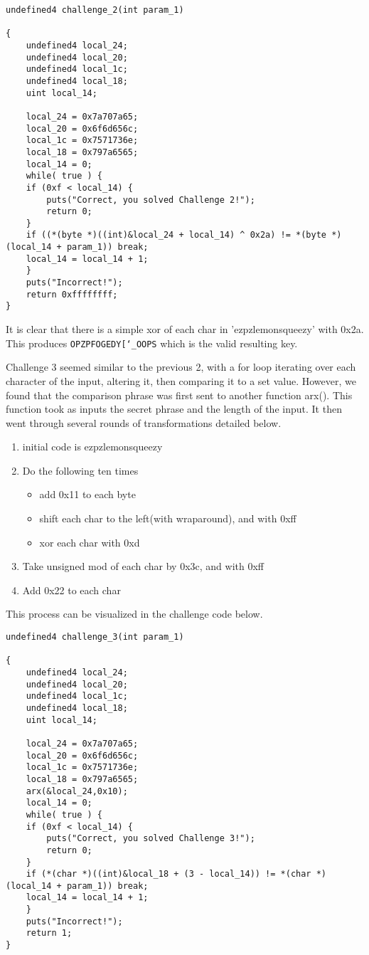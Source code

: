 \begin{lstlisting}
undefined4 challenge_2(int param_1)

{
	undefined4 local_24;
	undefined4 local_20;
	undefined4 local_1c;
	undefined4 local_18;
	uint local_14;
	
	local_24 = 0x7a707a65;
	local_20 = 0x6f6d656c;
	local_1c = 0x7571736e;
	local_18 = 0x797a6565;
	local_14 = 0;
	while( true ) {
	if (0xf < local_14) {
		puts("Correct, you solved Challenge 2!");
		return 0;
	}
	if ((*(byte *)((int)&local_24 + local_14) ^ 0x2a) != *(byte *)(local_14 + param_1)) break;
	local_14 = local_14 + 1;
	}
	puts("Incorrect!");
	return 0xffffffff;
}
\end{lstlisting}

It is clear that there is a simple xor of each char in 'ezpzlemonsqueezy' with 0x2a. This produces \texttt{OPZPFOGEDY[\char`_OOPS} which is the valid resulting key.

Challenge 3 seemed similar to the previous 2, with a for loop iterating over each character of the input, altering it, then comparing it to a set value. However, we found that the comparison phrase was first sent to another function arx(). This function took as inputs the secret phrase and the length of the input. It then went through several rounds of transformations detailed below.

\begin{enumerate}
\item initial code is ezpzlemonsqueezy
\item Do the following ten times
	\begin{itemize}
	\item add 0x11 to each byte
	\item shift each char to the left(with wraparound), and with 0xff
	\item xor each char with 0xd
	\end{itemize}
\item Take unsigned mod of each char by 0x3c, and with 0xff
\item Add 0x22 to each char
\end{enumerate}

This process can be visualized in the challenge code below.

\begin{lstlisting}
undefined4 challenge_3(int param_1)

{
	undefined4 local_24;
	undefined4 local_20;
	undefined4 local_1c;
	undefined4 local_18;
	uint local_14;
	
	local_24 = 0x7a707a65;
	local_20 = 0x6f6d656c;
	local_1c = 0x7571736e;
	local_18 = 0x797a6565;
	arx(&local_24,0x10);
	local_14 = 0;
	while( true ) {
	if (0xf < local_14) {
		puts("Correct, you solved Challenge 3!");
		return 0;
	}
	if (*(char *)((int)&local_18 + (3 - local_14)) != *(char *)(local_14 + param_1)) break;
	local_14 = local_14 + 1;
	}
	puts("Incorrect!");
	return 1;
}
\end{lstlisting}

